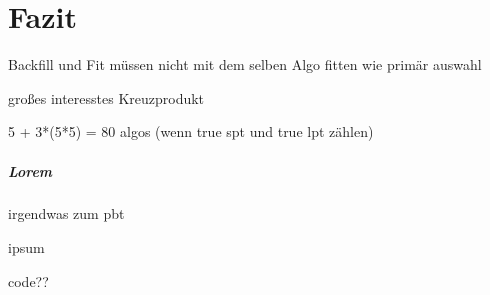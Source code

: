 \chapter{Fazit}

Backfill und Fit müssen nicht mit dem selben Algo fitten wie primär auswahl

großes interesstes Kreuzprodukt

5 + 3*(5*5) = 80 algos (wenn true spt und true lpt zählen)
\paragraph{Lorem}
irgendwas zum pbt

ipsum


code??
